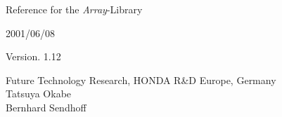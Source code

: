 \begin{LARGE}

{\bf

\begin{center}
Reference for the {\em Array}-Library\\

\vspace*{10mm}    

2001/06/08\\

\vspace*{10mm}
   
Version. 1.12\\

\end{center}

\vspace*{110mm}

{\normalsize Future Technology Research, HONDA R\&D Europe, Germany}\\
\hspace*{32mm} Tatsuya Okabe\\
\hspace*{32mm} Bernhard Sendhoff\\

}

\end{LARGE}